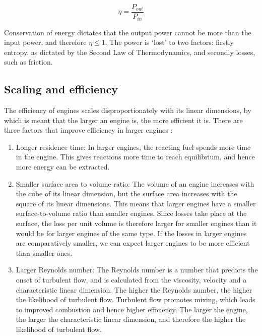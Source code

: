 \begin{equation}
\eta = \frac{P_{out}}{P_{in}}
\label{eqn:efficiency}
\end{equation}

Conservation of energy dictates that the output power cannot be more than the
input power, and therefore \(\eta \leq 1\). The power is `lost' to two factors:
firstly entropy, as dictated by the Second Law of Thermodynamics, and secondly
losses, such as friction.

\subsection{Scaling and efficiency} \label{par:scaling}

The efficiency of engines scales disproportionately with its linear dimensions,
by which is meant that the larger an engine is, the more efficient it is. There
are three factors that improve efficiency in larger engines \autocite{Brown2017}:

\begin{enumerate}

\item Longer residence time: In larger engines, the reacting fuel spends more
time in the engine. This gives reactions more time to reach equilibrium, and
hence more energy can be extracted.

\item Smaller surface area to volume ratio: The volume of an engine increases
with the cube of its linear dimension, but the surface area increases with the
square of its linear dimensions. This means that larger engines have a smaller
surface-to-volume ratio than smaller engines. Since losses take place at the
surface, the loss per unit volume is therefore larger for smaller engines than
it would be for larger engines of the same type. If the losses in larger engines
are comparatively smaller, we can expect larger engines to be more
efficient than smaller ones. 
  
\item Larger Reynolds number: The Reynolds number is a number that predicts the
onset of turbulent flow, and is calculated from the viscosity, velocity and a
characteristic linear dimension.  The higher the Reynolds number, the higher the
likelihood of turbulent flow. Turbulent flow promotes mixing, which leads to
improved combustion and hence higher efficiency. The larger the engine, the
larger the characteristic linear dimension, and therefore the higher the
likelihood of turbulent flow.

\end{enumerate}

